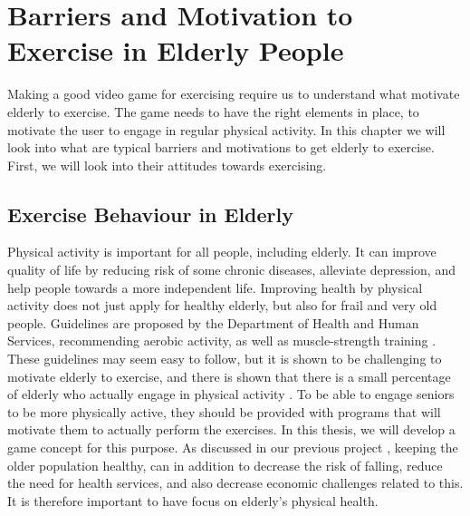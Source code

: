 \chapter{Barriers and Motivation to Exercise in Elderly People  }
\label{chap:olderexercise}
Making a good video game for exercising require us to understand what motivate elderly to exercise. The game needs to have the right elements in place, to motivate the user to engage in regular physical activity. In this chapter we will look into what are typical barriers and motivations to get elderly to exercise. First, we will look into their attitudes towards exercising. 

\section{Exercise Behaviour in Elderly}
Physical activity is important for all people, including elderly. It can improve quality of life by reducing risk of some chronic diseases, alleviate depression, and help people towards a more independent life. Improving health by physical activity does not just apply for healthy elderly, but also for frail and very old people. Guidelines are proposed by the Department of Health and Human Services, recommending aerobic activity, as well as muscle-strength training \cite{guidelines}. These guidelines  may seem easy to follow, but it is shown to be challenging to motivate elderly to exercise, and there is shown that there is a small percentage of elderly who actually engage in physical activity \cite{olderamericans}. To be able to engage seniors to be more physically active, they should be provided with programs that will motivate them to actually perform the exercises. In this thesis, we will develop a game concept for this purpose.   As discussed in our previous project \cite{project}, keeping the older population healthy, can in addition to decrease the risk of falling, reduce the need for health services, and also decrease economic challenges related to this.  It is therefore important to have focus on elderly's physical health. 

